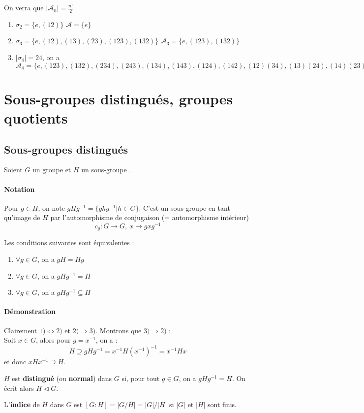 \documentclass[a4paper, oneside]{report}
\theoremstyle{break}
\newcommand{\sg}{sous-groupe }
\newcommand{\dem}{\subsubsection{Démonstration}}
\begin{document}
\remar
On verra que $|\mathcal{A}_n|=\frac{n!}{2}$

\exem
\begin{enumerate}
\item $\sigma_2=\{e,(12)\}$ $\mathcal{A}=\{e\}$
\item $\sigma_3=\{e, (12), (13), (23), (123), (132)\}$ $\mathcal{A}_3=\{e,(123),(132)\}$
\item $|\sigma_4|=24$, on a $\mathcal{A}_4=\{e,(123),(132),(234),(243),(134),(143),(124),(142),(12)(34), (13)(24), (14)(23)\}$
\end{enumerate}

\chapter{Sous-groupes distingués, groupes quotients}
\section{Sous-groupes distingués}

Soient $G$ un groupe et $H$ un \sg.\\

\subsubsection{Notation}
Pour $g\in H$, on note $gHg^{-1}=\{ghg^{-1}| h\in G\}$. C'est un \sg en tant qu'image de $H$ par l'automorphisme de conjugaison (= automorphisme intérieur)
$$c_g:G\rightarrow G,~x\mapsto gxg^{-1}$$

\propr
Les conditions suivantes sont équivalentes :
\begin{enumerate}
\item $\forall g\in G$, on a $gH=Hg$
\item $\forall g\in G$, on a $gHg^{-1}=H$
\item $\forall g\in G$, on a $gHg^{-1}\subseteq H$
\end{enumerate}

\dem
Clairement $1) \Leftrightarrow 2)$ et $2) \Rightarrow 3)$. Montrons que $3)\Rightarrow 2)$ :\\
Soit $x\in G$, alors pour $g=x^{-1}$, on a :
$$H\supseteq gHg^{-1}=x^{-1}H(x^{-1})^{-1}=x^{-1}Hx$$
et donc $xHx^{-1}\supseteq H$.

$H$ est \textbf{distingué} (ou \textbf{normal}) dans $G$ si, pour tout $g\in G$, on a $gHg^{-1}=H$. On écrit alors $H\vartriangleleft G$.

L'\textbf{indice} de $H$ dans $G$ est $[G:H]=|G/H| = |G|/|H|$ si $|G|$ et $|H|$ sont finis.
\end{document}
